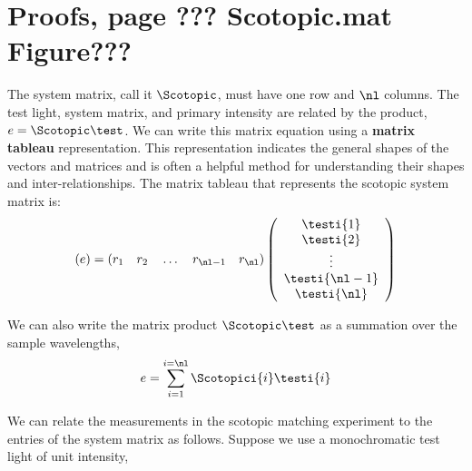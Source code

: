 


\doublesp

\section*{Proofs, page ??? Scotopic.mat Figure???}

The system matrix, call it $\Scotopic$, must have one row and $\nl$
columns.  The test light, system matrix, and primary intensity are
related by the product, $e = \Scotopic \test$.  We can write this
matrix equation using a {\bf matrix tableau} representation.  This
representation indicates the general shapes of the vectors and matrices
and is often a helpful method for understanding their shapes and
inter-relationships.  The matrix tableau that represents the scotopic
system matrix is:
\begin{equation}
  \left ( e \right ) =
  \left ( 
     r_1 ~~~ r_2 ~~~ \ldots ~~~ r_{{\nl}-1}~~~ r_{\nl}
  \right )
  \left (
   \begin{array}{c}
    \testi{1} \\
    \testi{2} \\
    \vdots \\
    \testi{\nl-1} \\
    \testi{\nl} \\
   \end{array}
  \right )
\end{equation}

We can also write the matrix product $\Scotopic \test$
as a summation over the sample wavelengths,
\begin{equation}
\label{e2:sm}
e = \sum_{i=1}^{i=\nl} \Scotopici{i} \testi{i} 
\end{equation}

We can relate the measurements in the scotopic matching experiment to
the entries of the system matrix as follows.  Suppose we use a
monochromatic test light of unit intensity,


